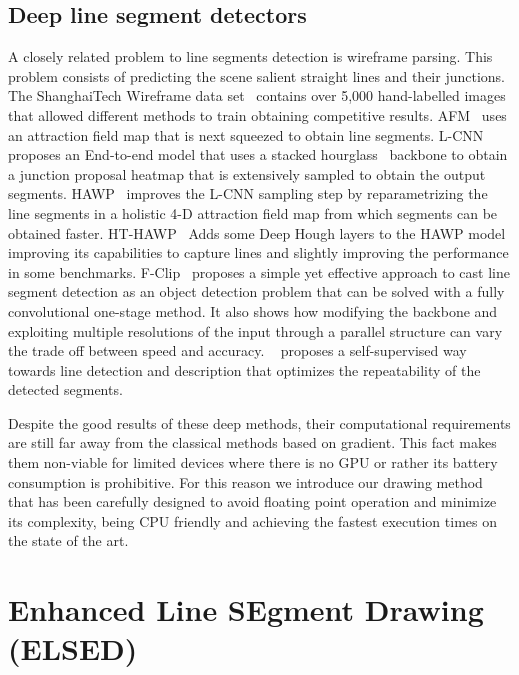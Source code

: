 \documentclass[preprint,12pt]{elsarticle}
\begin{document}
\subsection{Deep line segment detectors}\label{sec:soa_endpoint_prediction}

A closely related problem to line segments detection is wireframe parsing. This problem consists of predicting the scene salient straight lines and their junctions. The ShanghaiTech Wireframe data set~\cite{huang2018learning} contains over 5,000 hand-labelled images that allowed different methods to train obtaining competitive results. 
AFM~\cite{xue2019learning} uses an attraction field map that is next squeezed to obtain line segments. 
L-CNN~\cite{zhou2019end} proposes an End-to-end model that uses a stacked hourglass~\cite{newell2016stacked} backbone to obtain a junction proposal heatmap that is extensively sampled to obtain the output segments. 
HAWP~\cite{xue2020hawp} improves the L-CNN sampling step by reparametrizing the line segments in a holistic 4-D attraction field map from which segments can be obtained faster. 
HT-HAWP~\cite{xue2020hawp} Adds some Deep Hough layers to the HAWP model improving its capabilities to capture lines and slightly improving the performance in some benchmarks.
F-Clip~\cite{dai2021fully} proposes a simple yet effective approach to cast line segment detection as an object detection problem that can be solved with a fully convolutional one-stage method. It also shows how modifying the backbone and exploiting multiple resolutions of the input through a parallel structure can vary the trade off between speed and accuracy. 
~\cite{pautrat2021sold2} proposes a self-supervised way towards line detection and description that optimizes the repeatability of the detected segments.

Despite the good results of these deep methods, their computational requirements are still far away from the classical methods based on gradient. This fact makes them non-viable for limited devices where there is no GPU or rather its battery consumption is prohibitive.
For this reason we introduce our drawing method that has been carefully designed to avoid floating point operation and minimize its complexity, being CPU friendly and achieving the fastest execution times on the state of the art.


\section{Enhanced Line SEgment Drawing (ELSED)}
\label{sec:smart_edlines_implementation}
\end{document}
